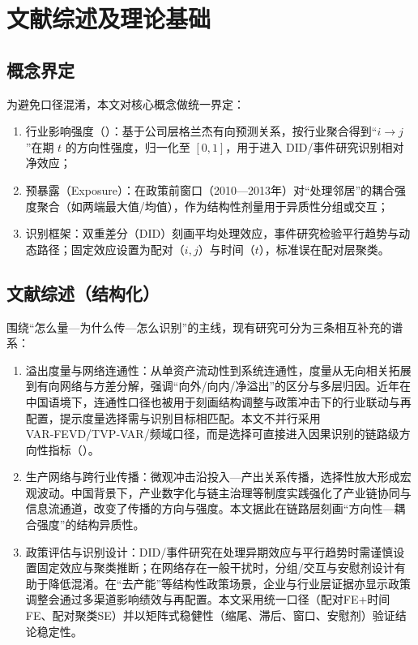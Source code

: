 \chapter{文献综述及理论基础}
\label{chap:literature}

\section{概念界定}
为避免口径混淆，本文对核心概念做统一界定：
\begin{enumerate}
  \item 行业影响强度（\II）：基于公司层格兰杰有向预测关系，按行业聚合得到“$i\to j$”在期 $t$ 的方向性强度，归一化至 $[0,1]$，用于进入 DID/事件研究识别相对净效应；
  \item 预暴露（Exposure）：在政策前窗口（2010—2013年）对“处理邻居”的耦合强度聚合（如两端最大值/均值），作为结构性剂量用于异质性分组或交互；
  \item 识别框架：双重差分（DID）刻画平均处理效应，事件研究检验平行趋势与动态路径；固定效应设置为配对（$i,j$）与时间（$t$），标准误在配对层聚类。
\end{enumerate}

\section{文献综述（结构化）}
围绕“怎么量—为什么传—怎么识别”的主线，现有研究可分为三条相互补充的谱系：
\begin{enumerate}
  \item 溢出度量与网络连通性：从单资产流动性到系统连通性，度量从无向相关拓展到有向网络与方差分解，强调“向外/向内/净溢出”的区分与多层归因\citep{billio2012econometric,diebold2012better,diebold2014connectedness}。近年在中国语境下，连通性口径也被用于刻画结构调整与政策冲击下的行业联动与再配置，提示度量选择需与识别目标相匹配。本文不并行采用 VAR‑FEVD/TVP‑VAR/频域口径，而是选择可直接进入因果识别的链路级方向性指标（\II）。
  \item 生产网络与跨行业传播：微观冲击沿投入—产出关系传播，选择性放大形成宏观波动\citep{acemoglu2012network,carvalho2014micro}。中国背景下，产业数字化与链主治理等制度实践强化了产业链协同与信息流通道，改变了传播的方向与强度\citep{Zhao2023DigitalInputNetwork,Qu2025ChainMaster,Lin2022ChainLeaderSystem}。本文据此在链路层刻画“方向性—耦合强度”的结构异质性。
  \item 政策评估与识别设计：DID/事件研究在处理异期效应与平行趋势时需谨慎设置固定效应与聚类推断\citep{sun2021event,bertrand2004much,cameron2015practitioner,angrist2009mostly}；在网络存在一般干扰时，分组/交互与安慰剂设计有助于降低混淆\citep{aronow2017interference,athey2018network}。在“去产能”等结构性政策场景，企业与行业层证据亦显示政策调整会通过多渠道影响绩效与再配置\citep{Wang2022DecapacityTFP}。本文采用统一口径（配对FE+时间FE、配对聚类SE）并以矩阵式稳健性（缩尾、滞后、窗口、安慰剂）验证结论稳定性。
\end{enumerate}

